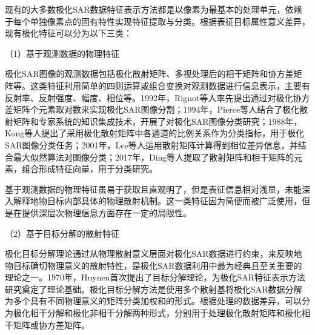 
现有的大多数极化SAR数据特征表示方法都是以像素为最基本的处理单元，依赖于每个单独像素点的固有特性实现特征提取与分类。根据表征目标属性意义差异，现有极化特征可以分为以下三类：

（1）基于观测数据的物理特征

极化SAR图像的观测数据包括极化散射矩阵、多视处理后的相干矩阵和协方差矩阵等。这类特征利用简单的四则运算或组合变换对观测数据进行信息表示，主要有反射率、反射强度、幅度、相位等。1992年，Rignot等人率先提出通过对极化协方差矩阵个元素取对数来实现极化SAR图像分割；1994年，Pierce等人结合了极化散射矩阵和专家系统的知识集成技术，开展了对极化SAR图像分类研究；1988年，Kong等人提出了采用极化散射矩阵中各通道的比例关系作为分类指标，用于极化SAR图像分类任务；2001年，Lee等人运用散射矩阵计算得到相位差异信息，并结合最大似然算法对图像分类；2017年，Ding等人提取了散射矩阵和相干矩阵的元素，组合形成特征向量，用于分类研究。

基于观测数据的物理特征虽易于获取且直观明了，但是表征信息相对浅显，未能深入解释地物目标内部具体的物理散射机制。这一类特征因为简便而被广泛使用，但是在提供深层次物理信息方面存在一定的局限性。


（2）基于目标分解的散射特征

极化目标分解理论通过从物理散射意义层面对极化SAR数据进行约束，来反映地物目标确切物理意义的散射特性，是极化SAR数据利用中最为经典且至关重要的理论之一。1970年，Huynen首次提出了目标分解理论，为极化SAR特征表示方法研究奠定了理论基础。极化目标分解方法是使用多个散射基将极化SAR数据分解为多个具有不同物理意义的矩阵分类加权和的形式。根据处理的数据差异，可以分为极化相干分解和极化非相干分解两种形式，分别用于处理极化散射矩阵和极化相干矩阵或协方差矩阵。

